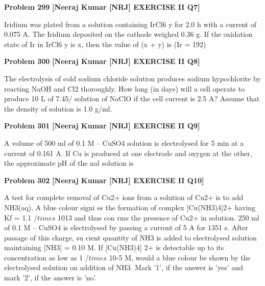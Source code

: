 \begin{problembox}
\textbf{Problem 299} \hfill \textbf{[Neeraj Kumar [NRJ] EXERCISE II Q7]}
\label{q:ext-nrj_all_questions-299}

Iridium was plated from a solution containing 
IrCl6
y for 2.0 h with a current of 0.075 A. The 
Iridium deposited on the cathode weighed 0.36 g. 
If the oxidation state of Ir in IrCl6
y is x, then the 
value of (x + y) is (Ir = 192)
\end{problembox}

\begin{problembox}
\textbf{Problem 300} \hfill \textbf{[Neeraj Kumar [NRJ] EXERCISE II Q8]}
\label{q:ext-nrj_all_questions-300}

The electrolysis of cold sodium chloride solution 
produces sodium hypochlorite by reacting NaOH 
and Cl2 thoroughly. How long (in days) will a 
cell operate to produce 10 L of 7.45/%
solution of NaClO if the cell current is 2.5 A? 
Assume that the density of solution is 1.0 g/ml.
\end{problembox}

\begin{problembox}
\textbf{Problem 301} \hfill \textbf{[Neeraj Kumar [NRJ] EXERCISE II Q9]}
\label{q:ext-nrj_all_questions-301}

A volume of 500 ml of 0.1 M -- CuSO4 solution is 
electrolysed for 5 min at a current of 0.161 A. If 
Cu is produced at one electrode and oxygen at the 
other, the approximate pH of the   nal solution is
\end{problembox}

\begin{problembox}
\textbf{Problem 302} \hfill \textbf{[Neeraj Kumar [NRJ] EXERCISE II Q10]}
\label{q:ext-nrj_all_questions-302}

A test for complete removal of Cu2+ ions from a 
solution of Cu2+ is to add NH3(aq). A blue colour 
signi  es the  formation of complex [Cu(NH3)4]2+ 
having Kf = 1.1  $/times$  1013 and thus con  rms the 
presence of Cu2+ in solution. 250 ml of 0.1 M -- 
CuSO4 is electrolysed by passing a current of 5 A 
for 1351 s. After passage of this charge, su   cient 
quantity of NH3 is added to electrolysed solution 
maintaining [NH3] = 0.10 M. If [Cu(NH3)4] 2+ is 
detectable up to its concentration as low as 1 $/times$ 
10-5 M, would a blue colour be shown by the 
electrolysed solution on addition of NH3. Mark 
'1', if the answer is 'yes' and mark '2', if the 
answer is 'no'.
\end{problembox}


